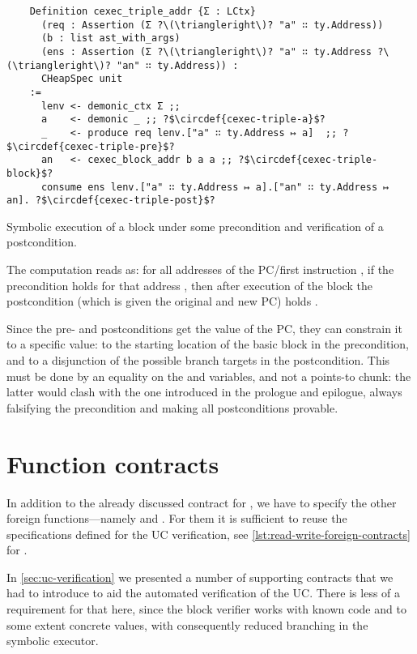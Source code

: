 \begin{listing}[htb]
  \startcstep
  \begin{verbatim}
    Definition cexec_triple_addr {Σ : LCtx}
      (req : Assertion (Σ ?\(\triangleright\)? "a" ∷ ty.Address))
      (b : list ast_with_args)
      (ens : Assertion (Σ ?\(\triangleright\)? "a" ∷ ty.Address ?\(\triangleright\)? "an" ∷ ty.Address)) :
      CHeapSpec unit
    :=
      lenv <- demonic_ctx Σ ;;
      a    <- demonic _ ;; ?$\circdef{cexec-triple-a}$?
      _    <- produce req lenv.["a" ∷ ty.Address ↦ a]  ;; ?$\circdef{cexec-triple-pre}$?
      an   <- cexec_block_addr b a a ;; ?$\circdef{cexec-triple-block}$?
      consume ens lenv.["a" ∷ ty.Address ↦ a].["an" ∷ ty.Address ↦ an]. ?$\circdef{cexec-triple-post}$?
  \end{verbatim}
  \caption{Symbolic execution of a block under some precondition and verification of a postcondition.}
  \label{lst:cexec-triple}
\end{listing}

The computation reads as: for all addresses of the PC/first instruction , if the precondition holds for that address , then after execution of the block  the postcondition (which is given the original and new PC) holds .

Since the pre- and postconditions get the value of the PC, they can constrain it to a specific value: to the starting location of the basic block in the precondition, and to a disjunction of the possible branch targets in the postcondition. This must be done by an equality on the  and  variables, and not a points-to chunk: the latter would clash with the one introduced in the prologue and epilogue, always falsifying the precondition and making all postconditions provable.

\section{Function contracts}

In addition to the already discussed contract for , we have to specify the other foreign functions---namely  and . For them it is sufficient to reuse the specifications defined for the UC verification, see \cref{lst:read-write-foreign-contracts} for .

In \cref{sec:uc-verification} we presented a number of supporting contracts that we had to introduce to aid the automated verification of the UC. There is less of a requirement for that here, since the block verifier works with known code and to some extent concrete values, with consequently reduced branching in the symbolic executor.

